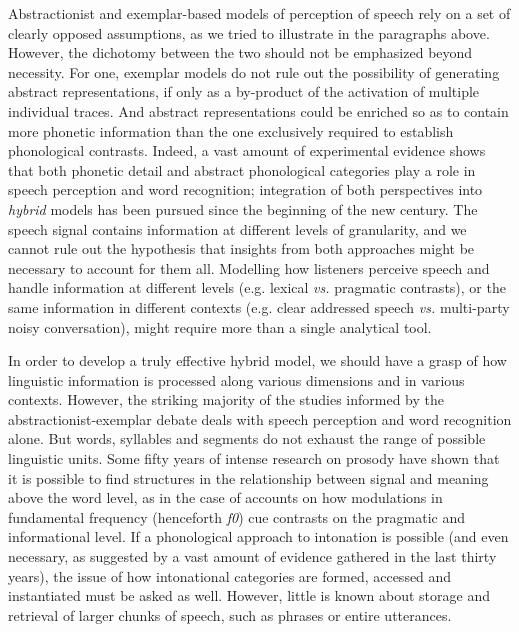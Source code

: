 Abstractionist and exemplar-based models of perception of speech rely on a set of clearly opposed assumptions, as we tried to illustrate in the paragraphs above. However, the dichotomy between the two should not be emphasized beyond necessity. For one, exemplar models do not rule out the possibility of generating abstract representations, if only as a by-product of the activation of multiple individual traces. And abstract representations could be enriched so as to contain more phonetic information than the one exclusively required to establish phonological contrasts. Indeed, a vast amount of experimental evidence shows that both phonetic detail and abstract phonological categories play a role in speech perception and word recognition; integration of both perspectives into \textit{hybrid} models has been pursued since the beginning of the new century. The speech signal contains information at different levels of granularity, and we cannot rule out the hypothesis that insights from both approaches might be necessary to account for them all. Modelling how listeners perceive speech and handle information at different levels (e.g. lexical \textit{vs.} pragmatic contrasts), or the same information in different contexts (e.g. clear addressed speech \textit{vs.} multi-party noisy conversation), might require more than a single analytical tool. 

In order to develop a truly effective hybrid model, we should have a grasp of how linguistic information is processed along various dimensions and in various contexts. However, the striking majority of the studies informed by the abstractionist-exemplar debate deals with speech perception and word recognition alone. But words, syllables and segments do not exhaust the range of possible linguistic units. Some fifty years of intense research on prosody have shown that it is possible to find structures in the relationship between signal and meaning above the word level, as in the case of accounts on how modulations in fundamental frequency (henceforth \textit{f0}) cue contrasts on the pragmatic and informational level. If a phonological approach to intonation is possible (and even necessary, as suggested by a vast amount of evidence gathered in the last thirty years), the issue of how intonational categories are formed, accessed and instantiated must be asked as well. However, little is known about storage and retrieval of larger chunks of speech, such as phrases or entire utterances. 


